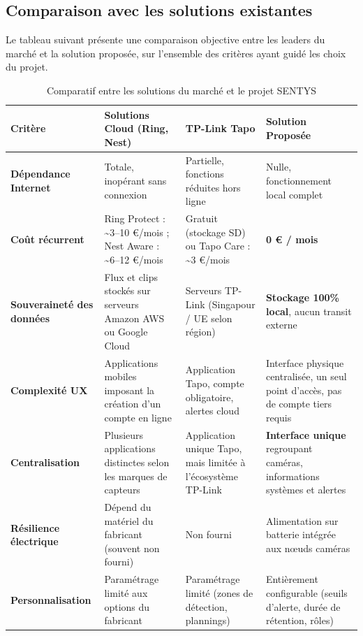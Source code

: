 \documentclass[12pt,a4paper]{article}
\begin{document}
\subsection{Comparaison avec les solutions existantes}

Le tableau suivant présente une comparaison objective entre les leaders du marché et la solution proposée, sur l'ensemble des critères ayant guidé les choix du projet.

\begin{table}[H]
\centering
\small
\renewcommand{\arraystretch}{1.3}
\begin{tabular}{|l|p{2.8cm}|p{2.8cm}|p{3.8cm}|}
\hline
\textbf{Critère} & \textbf{Solutions Cloud (Ring, Nest)} & \textbf{TP-Link Tapo} & \textbf{Solution Proposée} \\
\hline
\textbf{Dépendance Internet} & Totale, inopérant sans connexion & Partielle, fonctions réduites hors ligne & Nulle, fonctionnement local complet \\
\hline
\textbf{Coût récurrent} & Ring Protect : \textasciitilde 3--10 €/mois ; Nest Aware : \textasciitilde 6--12 €/mois & Gratuit (stockage SD) ou Tapo Care : \textasciitilde 3 €/mois & \textbf{0 € / mois} \\
\hline
\textbf{Souveraineté des données} & Flux et clips stockés sur serveurs Amazon AWS ou Google Cloud & Serveurs TP-Link (Singapour / UE selon région) & \textbf{Stockage 100\% local}, aucun transit externe \\
\hline
\textbf{Complexité UX} & Applications mobiles imposant la création d'un compte en ligne & Application Tapo, compte obligatoire, alertes cloud & Interface physique centralisée, un seul point d'accès, pas de compte tiers requis \\
\hline
\textbf{Centralisation} & Plusieurs applications distinctes selon les marques de capteurs & Application unique Tapo, mais limitée à l'écosystème TP-Link & \textbf{Interface unique} regroupant caméras, informations systèmes et alertes \\
\hline
\textbf{Résilience électrique} & Dépend du matériel du fabricant (souvent non fourni) & Non fourni & Alimentation sur batterie intégrée aux nœuds caméras \\
\hline
\textbf{Personnalisation} & Paramétrage limité aux options du fabricant & Paramétrage limité (zones de détection, plannings) & Entièrement configurable (seuils d'alerte, durée de rétention, rôles) \\
\hline
\end{tabular}
\caption{Comparatif entre les solutions du marché et le projet SENTYS}
\end{table}
\end{document}
